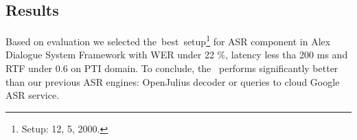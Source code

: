 \subsection*{Results}
\label{sec:results}


Based on evaluation we selected the~best~setup\footnote{Setup:  12,  5,  2000.} for ASR component in Alex Dialogue System Framework with  WER under 22 \%, latency less tha 200 ms and RTF under 0.6 on \ac{PTI} domain.
To conclude, the~ performs significantly better than our previous \ac{ASR} engines: OpenJulius decoder or queries to cloud Google ASR service.

